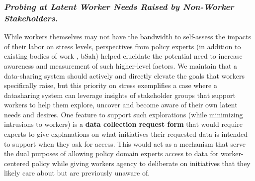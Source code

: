 \subsubsection{{\textbf{\textit{Probing at Latent Worker Needs Raised by Non-Worker Stakeholders.}}}}
{While workers themselves may not have the bandwidth to self-assess the impacts of their labor on stress levels, perspectives from policy experts (in addition to existing bodies of work \cite{making}, bSah}) helped elucidate the potential need to increase awareness and measurement of such higher-level factors.
%
%
We maintain that a data-sharing system should actively and directly elevate the goals that workers specifically raise, but this priority on stress exemplifies a case where a datasharing system can leverage insights of stakeholder groups that support workers to help them explore, uncover and become aware of their own latent needs and desires.
One feature to support such explorations (while minimizing intrusions to workers) is a \textbf{data collection request form} that 
would require experts to give explanations on what initiatives their requested data is intended to support when they ask for access. This would act as a mechanism that serve the dual purposes of allowing policy domain experts access to data for worker-centered policy while giving workers agency to deliberate on initiatives that they likely care about but are previously unaware of.%

